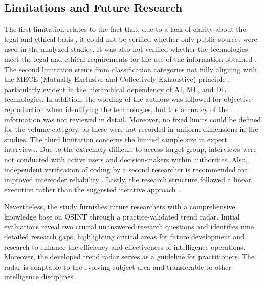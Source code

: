 \documentclass[10pt]{article}
\begin{document}

\subsection{Limitations and Future Research}

The first limitation relates to the fact that, due to a lack of clarity about the legal
and ethical basis \cite{Ghioni.2023,Wittmer.2022},
it could not be verified whether only public sources \cite{NorthAtlanticTreatyOrganization.2002} were used
in the analyzed studies. It was also not verified whether the technologies meet the
legal and ethical requirements for the use of the information obtained
\cite{PastorGalindo.2020,Wittmer.2022}. The second
limitation stems from classification categories not fully aligning with the
MECE (Mutually-Exclusive-and-Collectively-Exhaustive) principle \cite{Lee.2018},
particularly evident in the hierarchical dependency of AI, ML, and DL technologies. In addition,
the wording of the authors was followed for objective reproduction when identifying the technologies,
but the accuracy of the information was not reviewed in detail. Moreover, no fixed limits could be defined
for the volume category, as these were not recorded in uniform dimensions in the studies.
The third limitation concerns the limited sample size in expert interviews. Due to the
extremely difficult-to-access target group, interviews were not conducted with active users and decision-makers within authorities.
Also, independent verification of coding by a second researcher is recommended for improved intercoder reliability 
\cite{Bogner.2002c, Glaser.2009}. Lastly, the research structure followed a linear execution rather than the suggested iterative approach \cite{Peffers.2007}.

Nevertheless, the study furnishes future researchers with a comprehensive knowledge base on OSINT
through a practice-validated trend radar.
Initial evaluations reveal two crucial unanswered research questions and identifies nine detailed research gaps, highlighting
critical areas for future development and research to enhance the efficiency and effectiveness of intelligence operations.
Moreover, the developed trend radar serves as a guideline for practitioners. The radar
is adaptable to the evolving subject area and transferable to other intelligence disciplines.
\end{document}
